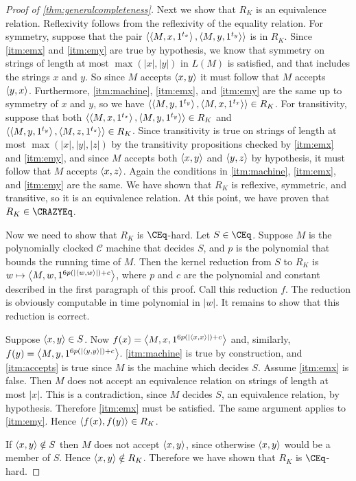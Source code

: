 \begin{proof}[Proof of \autoref{thm:generalcompleteness}]
  Next we show that $R_K$ is an equivalence relation.
  Reflexivity follows from the reflexivity of the equality relation.
  For symmetry, suppose that the pair $\langle\left\langle M,x,1^{t_x}\right\rangle,\left\langle M,y,1^{t_y}\right\rangle\rangle$ is in $R_K$.
  Since \autoref{itm:emx} and \autoref{itm:emy} are true by hypothesis, we know that symmetry on strings of length at most $\max(|x|, |y|)$ in $L(M)$ is satisfied, and that includes the strings $x$ and $y$.
  So since $M$ accepts $\langle x,y\rangle$ it must follow that $M$ accepts $\langle y,x\rangle$.
  Furthermore, \autoref{itm:machine}, \autoref{itm:emx}, and \autoref{itm:emy} are the same up to symmetry of $x$ and $y$, so we have $\langle\left\langle M,y,1^{t_y}\right\rangle,\left\langle M,x,1^{t_x}\right\rangle\rangle\in R_K$.
  For transitivity, suppose that both $\langle\left\langle M,x,1^{t_x}\right\rangle,\left\langle M,y,1^{t_y}\right\rangle\rangle\in R_K$ and $\langle\left\langle M,y,1^{t_y}\right\rangle,\left\langle M,z,1^{t_z}\right\rangle\rangle\in R_K$.
  Since transitivity is true on strings of length at most $\max(|x|, |y|, |z|)$ by the transitivity propositions checked by \autoref{itm:emx} and \autoref{itm:emy}, and since $M$ accepts both $\langle x,y\rangle$ and $\langle y,z\rangle$ by hypothesis, it must follow that $M$ accepts $\langle x,z\rangle$.
  Again the conditions in \autoref{itm:machine}, \autoref{itm:emx}, and \autoref{itm:emy} are the same.
  We have shown that $R_K$ is reflexive, symmetric, and transitive, so it is an equivalence relation.
  At this point, we have proven that $R_K\in\CRAZYEq$.

  Now we need to show that $R_K$ is $\CEq$-hard.
  Let $S\in\CEq$.
  Suppose $M$ is the polynomially clocked $\mathcal{C}$ machine that decides $S$, and $p$ is the polynomial that bounds the running time of $M$.
  Then the kernel reduction from $S$ to $R_K$ is $w\mapsto\left\langle M,w,1^{6p(|\langle w,w\rangle|)+c}\right\rangle$, where $p$ and $c$ are the polynomial and constant described in the first paragraph of this proof.
  Call this reduction $f$.
  The reduction is obviously computable in time polynomial in $|w|$.
  It remains to show that this reduction is correct.

  Suppose $\langle x,y\rangle\in S$.
  Now $f(x)=\left\langle M,x,1^{6p(|\langle x,x\rangle|)+c}\right\rangle$ and, similarly, $f(y)=\left\langle M,y,1^{6p(|\langle y,y\rangle|)+c}\right\rangle$.
  \autoref{itm:machine} is true by construction, and \autoref{itm:accepts} is true since $M$ is the machine which decides $S$.
  Assume \autoref{itm:emx} is false.
  Then $M$ does not accept an equivalence relation on strings of length at most $|x|$.
  This is a contradiction, since $M$ decides $S$, an equivalence relation, by hypothesis.
  Therefore \autoref{itm:emx} must be satisfied.
  The same argument applies to \autoref{itm:emy}.
  Hence $\langle f(x),f(y)\rangle\in R_K$.

  If $\langle x,y\rangle\notin S$ then $M$ does not accept $\langle x,y\rangle$, since otherwise $\langle x,y\rangle$ would be a member of $S$.
  Hence $\langle x,y\rangle\notin R_K$.
  Therefore we have shown that $R_K$ is $\CEq$-hard.
\end{proof}

